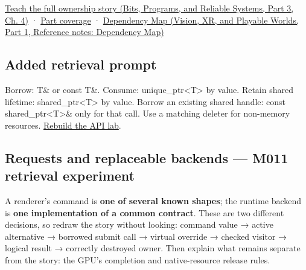 \href{../01-Bits-Programs-and-Reliable-Systems-P03/main.pdf\#nameddest=01-foundations-i-ch004-from-a-live-object-to-responsible-resource-ownership}{Teach the full ownership story (Bits, Programs, and Reliable Systems, Part 3, Ch. 4)} · \hyperref[appendix-fd090d982a15-m010---parts-148-160]{Part coverage} · \href{../07-Vision-XR-and-Playable-Worlds-P01/main.pdf\#nameddest=appendix-4ad47bdd269a}{Dependency Map (Vision, XR, and Playable Worlds, Part 1, Reference notes: Dependency Map)}

\subsection{Added retrieval prompt}\label{appendix-960160274237-added-retrieval-prompt}

\hypertarget{appendix-960160274237-added-retrieval-prompt}{}

Borrow: T\& or const T\&. Consume: unique\_ptr\textless T\textgreater{} by value. Retain shared lifetime: shared\_ptr\textless T\textgreater{} by value. Borrow an existing shared handle: const shared\_ptr\textless T\textgreater{}\& only for that call. Use a matching deleter for non-memory resources. \hyperref[01-foundations-i-ch003-worked-api-choice-borrow-consume-retain-or-copy-a-value]{Rebuild the API lab}.

\subsection{Requests and replaceable backends --- M011 retrieval experiment}\label{appendix-960160274237-requests-and-replaceable-backends-m011-retrieval-experiment}

\hypertarget{appendix-960160274237-requests-and-replaceable-backends-m011-retrieval-experiment}{}

A renderer's command is \textbf{one of several known shapes}; the runtime backend is \textbf{one implementation of a common contract}. These are two different decisions, so redraw the story without looking: command value → active alternative → borrowed submit call → virtual override → checked visitor → logical result → correctly destroyed owner. Then explain what remains separate from the story: the GPU's completion and native-resource release rules.


